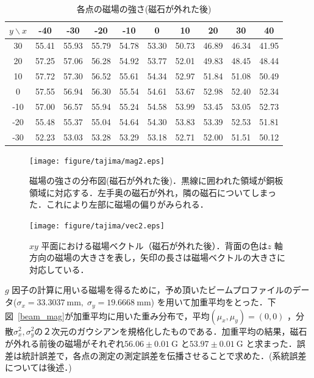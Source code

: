 \begin{table}[H]
\centering
\caption{各点の磁場の強さ(磁石が外れた後)}\label{MF2}
\begin{tabular}{|c||c|c|c|c|c|c|c|c|c|}\hline
$y \backslash x$ & -40 & -30 & -20 & -10 & 0 & 10 & 20 & 30 & 40 \\ \hline \hline
30 & 55.41 & 55.93 & 55.79 & 54.78 & 53.30 & 50.73 & 46.89 & 46.34 & 41.95 \\ \hline
20 & 57.25 & 57.06 & 56.28 & 54.92 & 53.77 & 52.01 & 49.83 & 48.45 & 48.44 \\ \hline
10 & 57.72 & 57.30 & 56.52 & 55.61 & 54.34 & 52.97 & 51.84 & 51.08 & 50.49 \\ \hline
0 & 57.55 & 56.94 & 56.30 & 55.54 & 54.61 & 53.67 & 52.98 & 52.40 & 52.34 \\ \hline
-10 & 57.00 & 56.57 & 55.94 & 55.24 & 54.58 & 53.99 & 53.45 & 53.05 & 52.73 \\ \hline
-20 & 55.48 & 55.37 & 55.04 & 54.64 & 54.30 & 53.83 & 53.39 & 52.53 & 51.81 \\ \hline
-30 & 52.23 & 53.03 & 53.28 & 53.29 & 53.18 & 52.71 & 52.00 & 51.51 & 50.12 \\ \hline
\end{tabular}
\end{table}
\begin{figure}[H]
\centering
\begin{minipage}{0.45\hsize}
\centering
\texttt{[image: figure/tajima/mag2.eps]}
\caption{磁場の強さの分布図(磁石が外れた後)．黒線に囲われた領域が銅板領域に対応する．左手奥の磁石が外れ，隣の磁石についてしまった．これにより左部に磁場の偏りがみられる．}
\label{mag2}
\end{minipage}
\begin{minipage}{0.45\hsize}
\centering
\texttt{[image: figure/tajima/vec2.eps]}
\caption{$xy$ 平面における磁場ベクトル（磁石が外れた後）．背面の色は$z$ 軸方向の磁場の大きさを表し，矢印の長さは磁場ベクトルの大きさに対応している．}
\label{vec2}
\end{minipage}
\end{figure}

$g$ 因子の計算に用いる磁場を得るために，予め頂いたビームプロファイルのデータ($\sigma_x = 33.3037~\mathrm{mm}, \; \sigma_y = 19.6668~\mathrm{mm}$) を用いて加重平均をとった．下図~\ref{beam_mag}が加重平均に用いた重み分布で，平均$(\mu_x,\mu_y)=(0,0)$ ，分散$\sigma_x^2, \sigma_y^2$の２次元のガウシアンを規格化したものである．加重平均の結果，磁石が外れる前後の磁場がそれぞれ$56.06 \pm 0.01~\mathrm{G}$ と$53.97\pm 0.01~\mathrm{G}$ と求まった．誤差は統計誤差で，各点の測定の測定誤差を伝播させることで求めた．(系統誤差については後述．)

